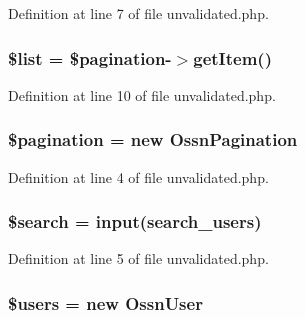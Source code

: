Definition at line 7 of file unvalidated.\+php.

\subsubsection[{\texorpdfstring{\$list}{$list}}]{\setlength{\rightskip}{0pt plus 5cm}\$list = \$pagination-\/$>$get\+Item()}\hypertarget{unvalidated_8php_a358b00350db3d8f227d500337cc437af}{}\label{unvalidated_8php_a358b00350db3d8f227d500337cc437af}


Definition at line 10 of file unvalidated.\+php.

\subsubsection[{\texorpdfstring{\$pagination}{$pagination}}]{\setlength{\rightskip}{0pt plus 5cm}\$pagination = new {\bf Ossn\+Pagination}}\hypertarget{unvalidated_8php_a388a4a950e936f746d3b9c1b56450ce7}{}\label{unvalidated_8php_a388a4a950e936f746d3b9c1b56450ce7}


Definition at line 4 of file unvalidated.\+php.

\subsubsection[{\texorpdfstring{\$search}{$search}}]{\setlength{\rightskip}{0pt plus 5cm}\$search = {\bf input}(\textquotesingle{}search\+\_\+users\textquotesingle{})}\hypertarget{unvalidated_8php_ae549977dd05a017aa81372f6994bf955}{}\label{unvalidated_8php_ae549977dd05a017aa81372f6994bf955}


Definition at line 5 of file unvalidated.\+php.

\subsubsection[{\texorpdfstring{\$users}{$users}}]{\setlength{\rightskip}{0pt plus 5cm}\$users = new {\bf Ossn\+User}}\hypertarget{unvalidated_8php_a28005d22fa7ef2dfe215ad886b497d9c}{}\label{unvalidated_8php_a28005d22fa7ef2dfe215ad886b497d9c}


